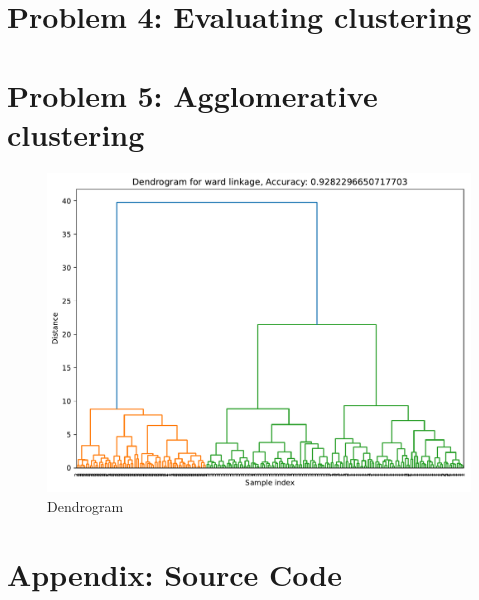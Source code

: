 \documentclass[a4paper]{article}
\begin{document}
\section*{Problem 4: Evaluating clustering}

\section*{Problem 5: Agglomerative clustering}

\begin{figure}[H]
  \begin{center}
    \includegraphics[width=\textwidth]{ola/dendrogram.pdf}
    \caption{Dendrogram}
    \label{fig:dendrogram}
  \end{center}
\end{figure}

\newpage


\printbibliography

\section*{Appendix: Source Code}




\end{document}
